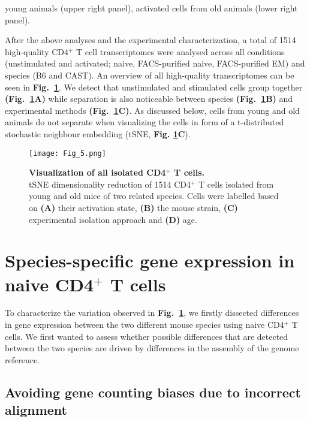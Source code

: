 {young animals (upper right panel), activated cells from old animals (lower right panel).
\\}
\captionsetup[figure]{list=yes}

After the above analyses and the experimental characterization, a total of 1514 high-quality CD4$^+$ T cell transcriptomes were analysed across all conditions (unstimulated and activated; naive, FACS-purified naive, FACS-purified EM) and species (B6 and CAST). An overview of all high-quality transcriptomes can be seen in \textbf{Fig.~\ref{fig1:all_cells}}. We detect that unstimulated and stimulated cells group together \textbf{(Fig.~\ref{fig1:all_cells}A)} while separation is also noticeable between species \textbf{(Fig.~\ref{fig1:all_cells}B)} and experimental methods \textbf{(Fig.~\ref{fig1:all_cells}C)}. As discussed below, cells from young and old animals do not separate when visualizing the cells in form of a t-distributed stochastic neighbour embedding (tSNE, \textbf{Fig. \ref{fig1:all_cells}C}). 

\newpage

\begin{figure}[!hb]
\centering
\texttt{[image: Fig\_5.png]}
\caption[Visualization of all isolated CD4$^+$ T cells]{\textbf{Visualization of all isolated CD4$^+$ T cells.}\\
tSNE dimensionality reduction of 1514 CD4$^+$ T cells isolated from young and old mice of two related species. Cells were labelled based on \textbf{(A)} their activation state, \textbf{(B)} the mouse strain, \textbf{(C)} experimental isolation approach and \textbf{(D)} age.}
\label{fig1:all_cells}
\end{figure}

\newpage

\section{Species-specific gene expression in naive CD4$^+$ T cells}

To characterize the variation observed in \textbf{Fig.~\ref{fig1:all_cells}}, we firstly dissected differences in gene expression between the two different mouse species using naive CD4$^+$ T cells. We first wanted to assess whether possible differences that are detected between the two species are driven by differences in the assembly of the genome reference.

\subsection{Avoiding gene counting biases due to incorrect alignment}

